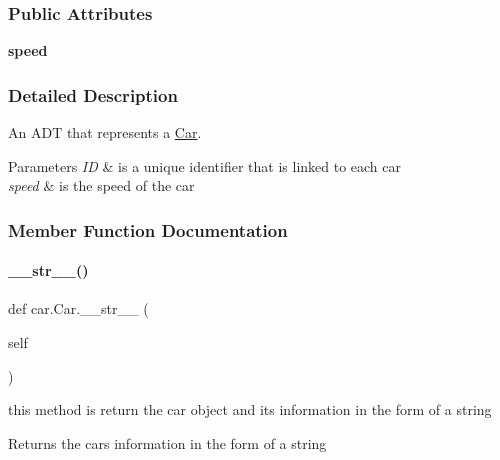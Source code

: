 \subsubsection*{Public Attributes}
\begin{DoxyCompactItemize}
\item 
\mbox{\label{classcar_1_1_car_ae9643e14576400287f5a98d95e6ebff7}} 
{\bfseries speed}
\end{DoxyCompactItemize}


\subsubsection{Detailed Description}
An A\+DT that represents a \mbox{\hyperlink{classcar_1_1_car}{Car}}. 


\begin{DoxyParams}{Parameters}
{\em ID} & is a unique identifier that is linked to each car \\
\hline
{\em speed} & is the speed of the car \\
\hline
\end{DoxyParams}


\subsubsection{Member Function Documentation}
\mbox{\label{classcar_1_1_car_a17a9b468d12c574f015ff0c7a3412aab}} 
\paragraph{\texorpdfstring{\_\_str\_\_()}{\_\_str\_\_()}}
{\footnotesize\ttfamily def car.\+Car.\+\_\+\+\_\+str\+\_\+\+\_\+ (\begin{DoxyParamCaption}\item[{}]{self }\end{DoxyParamCaption})}



this method is return the car object and it\textquotesingle{}s information in the form of a string 

\begin{DoxyReturn}{Returns}
the car\textquotesingle{}s information in the form of a string 
\end{DoxyReturn}
\mbox{\label{classcar_1_1_car_a990e5ebf23e690cf3b2de63e3a2525e1}} 
